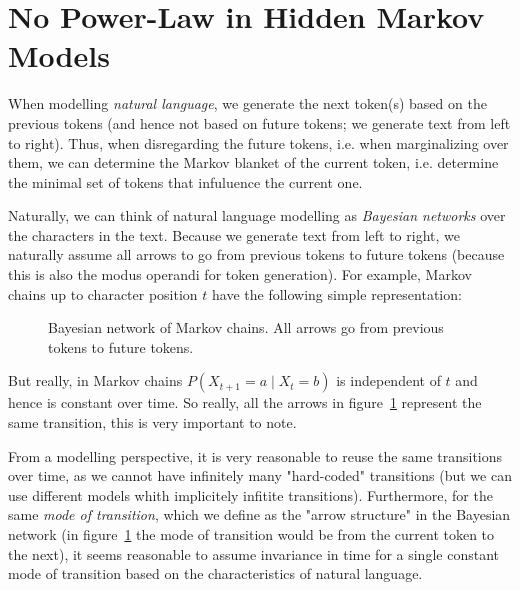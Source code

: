 \documentclass[../../main.tex]{subfiles}
\begin{document}
\section{No Power-Law in Hidden Markov Models}
    When modelling \emph{natural language}, we generate the next token(s) based on the previous tokens (and hence not based on future tokens; we generate text from left to right). Thus, when disregarding the future tokens, i.e. when marginalizing over them, we can determine the Markov blanket of the current token, i.e. determine the minimal set of tokens that infuluence the current one.

    Naturally, we can think of natural language modelling as \emph{Bayesian networks} over the characters in the text. Because we generate text from left to right, we naturally assume all arrows to go from previous tokens to future tokens (because this is also the modus operandi for token generation). For example, Markov chains up to character position $t$ have the following simple representation:

    \begin{figure}[h]
        \center
        \caption{Bayesian network of Markov chains. All arrows go from previous tokens to future tokens.}
        \label{fig:bayesian_network_markov_chain}
    \end{figure}

    But really, in Markov chains $P(X_{t + 1} = a \mid X_t = b)$ is independent of $t$ and hence is constant over time. So really, all the arrows in figure~\ref{fig:bayesian_network_markov_chain} represent the same transition, this is very important to note.

    From a modelling perspective, it is very reasonable to reuse the same transitions over time, as we cannot have infinitely many "hard-coded" transitions (but we can use different models whith implicitely infitite transitions). Furthermore, for the same \emph{mode of transition}, which we define as the "arrow structure" in the Bayesian network (in figure~\ref{fig:bayesian_network_markov_chain} the mode of transition would be from the current token to the next), it seems reasonable to assume invariance in time for a single constant mode of transition based on the characteristics of natural language.
\end{document}
